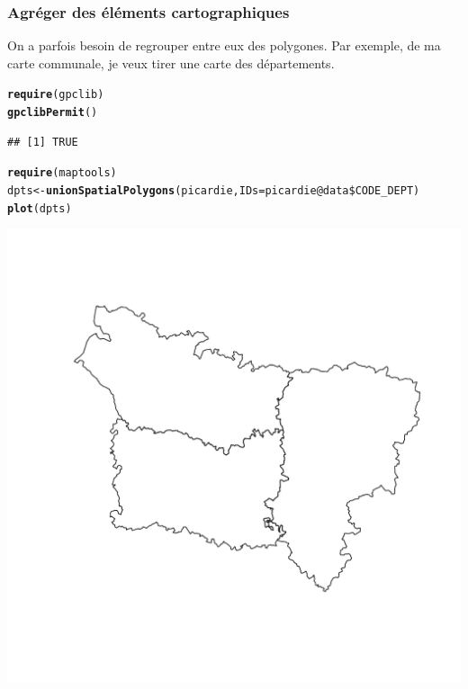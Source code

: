 \documentclass[slidetop, 10pt]{beamer}\usepackage{graphicx, color}
\makeatletter
\newcommand{\hlfunctioncall}[1]{\textcolor[rgb]{0.501960784313725,0,0.329411764705882}{\textbf{#1}}}%
\newenvironment{kframe}{%
 \def\at@end@of@kframe{}%
 \ifinner\ifhmode%
  \def\at@end@of@kframe{\end{minipage}}%
  \begin{minipage}{\columnwidth}%
 \fi\fi%
 \def\FrameCommand##1{\hskip\@totalleftmargin \hskip-\fboxsep
 \colorbox{shadecolor}{##1}\hskip-\fboxsep
     \hskip-\linewidth \hskip-\@totalleftmargin \hskip\columnwidth}%
 \MakeFramed {\advance\hsize-\width
   \@totalleftmargin\z@ \linewidth\hsize
   \@setminipage}}%
 {\par\unskip\endMakeFramed%
 \at@end@of@kframe}
\newenvironment{knitrout}{}{} %
\renewenvironment{knitrout}{\begin{tiny}}{\end{tiny}}
\makeatother
\begin{document}
\begin{frame}[fragile]
\frametitle{Agréger des éléments cartographiques}
On a parfois besoin de regrouper entre eux des polygones. Par exemple, de ma carte communale, je veux tirer une carte des départements. 

\begin{knitrout}\tiny
{}\color{fgcolor}\begin{kframe}
\begin{alltt}
\hlfunctioncall{require}(gpclib)
\hlfunctioncall{gpclibPermit}()
\end{alltt}
\begin{verbatim}
## [1] TRUE
\end{verbatim}
\begin{alltt}
\hlfunctioncall{require}(maptools)
dpts <- \hlfunctioncall{unionSpatialPolygons}(picardie, IDs = picardie@data\$CODE_DEPT)
\hlfunctioncall{plot}(dpts)
\end{alltt}
\end{kframe}

{\centering \includegraphics[width=.4\linewidth]{images/union} 

}


\end{knitrout}

\end{frame}
\end{document}
